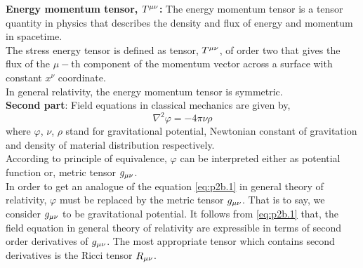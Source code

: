 \documentclass[../main-sheet.tex]{subfiles}
\begin{document}
        \begin{soln}
            \textbf{Energy momentum tensor, \(T^{\mu\nu}\):} The energy momentum tensor is a tensor quantity in physics that describes the density and flux of energy and momentum in spacetime.\\
            The stress energy tensor is defined as tensor, \(T^{\mu\nu}\), of order two that gives the flux of the \(\mu-\)th component of the momentum vector across a surface with constant \(x^\nu\) coordinate.\\
            In general relativity, the energy momentum tensor is symmetric.\\

            \textbf{Second part}: Field equations in classical mechanics are given by,
            \begin{equation}
                \nabla^2\varphi=-4\pi \nu \rho \label{eq:p2b.1}
            \end{equation}
            where \(\varphi\), \(\nu\), \(\rho\) stand for gravitational potential, Newtonian constant of gravitation and density of material distribution respectively.\\
            According to principle of equivalence, \(\varphi\) can be interpreted either as potential function or, metric tensor \(g_{\mu\nu}\).\\
            In order to get an analogue of the equation \eqref{eq:p2b.1} in general theory of relativity, \(\varphi\) must be replaced by the metric tensor \(g_{{\mu\nu}}\). That is to say, we consider \(g_{{\mu\nu}}\) to be gravitational potential. It follows from \eqref{eq:p2b.1} that, the field equation in general theory of relativity are expressible in terms of second order derivatives of \(g_{\mu\nu}\). The most appropriate tensor which contains second derivatives is the Ricci tensor \(R_{{\mu\nu}}\).\\


\end{soln}
\end{document}
